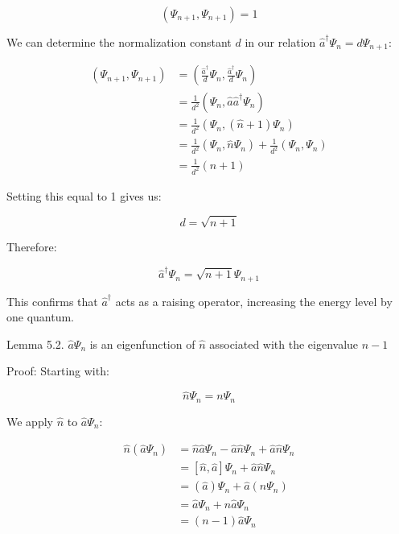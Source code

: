 \documentclass[italian]{HKNdocument}
\begin{document}
\begin{equation}
(\Psi_{n+1}, \Psi_{n+1}) = 1 \label{eq:5.25}
\end{equation}

We can determine the normalization constant $d$ in our relation $\hat{a}^\dagger\Psi_n = d\Psi_{n+1}$:

\begin{align}
(\Psi_{n+1}, \Psi_{n+1}) &= \left(\frac{\hat{a}^\dagger}{d}\Psi_n, \frac{\hat{a}^\dagger}{d}\Psi_n\right) \\
&= \frac{1}{d^2}(\Psi_n, \hat{a}\hat{a}^\dagger\Psi_n) \\
&= \frac{1}{d^2}(\Psi_n, (\hat{n}+1)\Psi_n) \label{eq:5.26} \\
&= \frac{1}{d^2}(\Psi_n, \hat{n}\Psi_n) + \frac{1}{d^2}(\Psi_n, \Psi_n) \\
&= \frac{1}{d^2}(n+1)
\end{align}

Setting this equal to 1 gives us:

\begin{equation}
d = \sqrt{n+1} \label{eq:5.27}
\end{equation}

Therefore:

\begin{equation}
\hat{a}^\dagger\Psi_n = \sqrt{n+1}\Psi_{n+1} \label{eq:5.28}
\end{equation}

This confirms that $\hat{a}^\dagger$ acts as a raising operator, increasing the energy level by one quantum.

Lemma 5.2. $\hat{a}\Psi_n$ is an eigenfunction of $\hat{n}$ associated with the eigenvalue $n-1$

Proof:
Starting with:

\begin{equation}
\hat{n}\Psi_n = n\Psi_n \label{eq:5.29}
\end{equation}

We apply $\hat{n}$ to $\hat{a}\Psi_n$:

\begin{align}
\hat{n}(\hat{a}\Psi_n) &= \hat{n}\hat{a}\Psi_n - \hat{a}\hat{n}\Psi_n + \hat{a}\hat{n}\Psi_n \\
&= [\hat{n}, \hat{a}]\Psi_n + \hat{a}\hat{n}\Psi_n \\
&= (\hat{a})\Psi_n + \hat{a}(n\Psi_n) \label{eq:5.30} \\
&= \hat{a}\Psi_n + n\hat{a}\Psi_n \\
&= (n-1)\hat{a}\Psi_n
\end{align}
\end{document}
